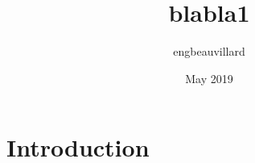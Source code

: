 \documentclass{article}
\title{blabla1}
\author{engbeauvillard }
\date{May 2019}
\begin{document}
\maketitle

\section{Introduction}
\end{document}
